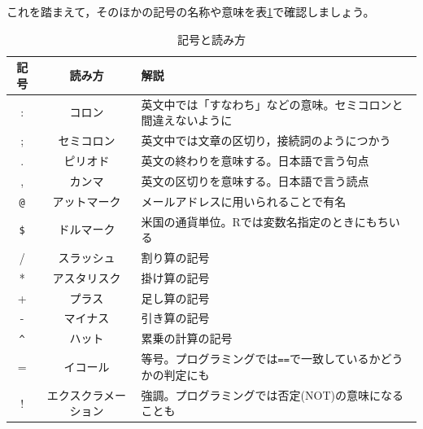 \documentclass{ltjsbook}
\begin{document}
これを踏まえて，そのほかの記号の名称や意味を表\ref{keyboardName}で確認しましょう。
\begin{table}[ht]
	\centering
	\caption{記号と読み方}
	\label{keyboardName}
	\begin{tabular}{ccl}
		記号        & 読み方            & 解説                                                                         \\\hline
		:         & コロン            & 英文中では「すなわち」などの意味。セミコロンと間違えないように                                            \\
		;         & セミコロン          & 英文中では文章の区切り，接続詞のようにつかう                                                     \\
		.         & ピリオド           & 英文の終わりを意味する。日本語で言う句点                                                       \\
		,         & カンマ            & 英文の区切りを意味する。日本語で言う読点                                                       \\
		\verb|@|  & アットマーク         & メールアドレスに用いられることで有名                                                         \\
		\verb|$|  & ドルマーク          & 米国の通貨単位。Rでは変数名指定のときにもちいる                                                   \\
		/         & スラッシュ          & 割り算の記号                                                                     \\
		*         & アスタリスク         & 掛け算の記号                                                                     \\
		+         & プラス            & 足し算の記号                                                                     \\
		-         & マイナス           & 引き算の記号                                                                     \\
		\verb|^|  & ハット            & 累乗の計算の記号                                                                   \\
		=         & イコール           & 等号。プログラミングでは\verb|==|で一致しているかどうかの判定にも                                      \\
		!         & エクスクラメーション     & 強調。プログラミングでは否定(NOT)の意味になることも                                               \\

\end{tabular}
\end{table}
\end{document}
